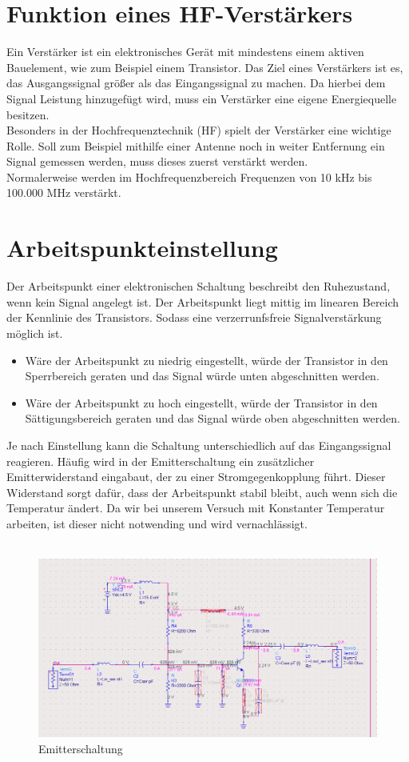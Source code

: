 

\section{Funktion eines HF-Verstärkers}
Ein Verstärker ist ein elektronisches Gerät mit mindestens einem 
aktiven Bauelement, wie zum Beispiel einem Transistor.
Das Ziel eines Verstärkers ist es, das Ausgangssignal 
größer als das Eingangssignal zu machen. Da hierbei dem Signal Leistung hinzugefügt
wird, muss ein Verstärker eine eigene Energiequelle besitzen.
\\
Besonders in der Hochfrequenztechnik (HF) spielt der Verstärker eine wichtige
Rolle. Soll zum Beispiel mithilfe einer Antenne noch in weiter Entfernung ein Signal
gemessen werden, muss dieses zuerst verstärkt werden.
\\
Normalerweise werden im Hochfrequenzbereich Frequenzen von 10 kHz bis 100.000 MHz
verstärkt.
\clearpage
\section{Arbeitspunkteinstellung}
Der Arbeitspunkt einer elektronischen Schaltung beschreibt den 
Ruhezustand, wenn kein Signal angelegt ist.
Der Arbeitspunkt liegt mittig im linearen Bereich der Kennlinie des Transistors.
Sodass eine verzerrunfsfreie Signalverstärkung möglich ist.
\begin{itemize}
    \item Wäre der Arbeitspunkt zu niedrig eingestellt, würde der Transistor in den Sperrbereich geraten und das Signal würde unten abgeschnitten werden.
    \item Wäre der Arbeitspunkt zu hoch eingestellt, würde der Transistor in den Sättigungsbereich geraten und das Signal würde oben abgeschnitten werden.
\end{itemize}
Je nach Einstellung kann die Schaltung unterschiedlich auf das Eingangssignal
reagieren.
Häufig wird in der Emitterschaltung ein zusätzlicher Emitterwiderstand eingabaut, der zu einer Stromgegenkopplung führt.
Dieser Widerstand sorgt dafür, dass der Arbeitspunkt stabil bleibt, auch wenn sich die Temperatur ändert.
Da wir bei unserem Versuch mit Konstanter Temperatur arbeiten, ist dieser nicht notwending und wird vernachlässigt.
\\
\\
\begin{figure}[h]
    \centering
    \includegraphics[width=1.0\textwidth]{Pictures/Schaltplan.png}
    \caption{Emitterschaltung}
\end{figure}
\\
